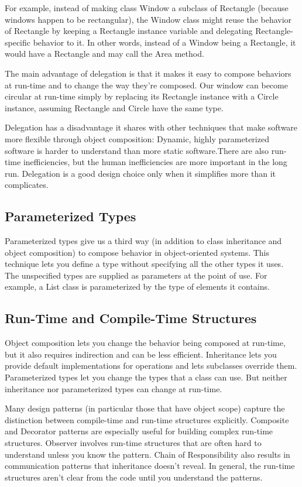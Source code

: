 \documentclass{article}
\begin{document}
For example, instead of making class Window a subclass of Rectangle (because windows happen to be rectangular), the Window class might reuse the behavior of Rectangle by keeping a Rectangle instance variable and delegating Rectangle-specific behavior to it. In other words, instead of a Window being a Rectangle, it would have a Rectangle and may call the Area method.

The main advantage of delegation is that it makes it easy to compose behaviors at run-time and to change the way they're composed. Our window can become circular at run-time simply by replacing its Rectangle instance with a Circle instance, assuming Rectangle and Circle have the same type.

Delegation has a disadvantage it shares with other techniques that make software more flexible through object composition: Dynamic, highly parameterized software is harder to understand than more static software.There are also run-time inefficiencies, but the human inefficiencies are more important in the long run. Delegation is a good design choice only when it simplifies more than it complicates.

\subsection{Parameterized Types}
Parameterized types give us a third way (in addition to class inheritance and object composition) to compose behavior in object-oriented systems. This
technique lets you define a type without specifying all the other types it uses. The unspecified types are supplied as parameters at the point of use. For example, a List class is parameterized by the type of elements it contains.


\subsection{Run-Time and Compile-Time Structures}

Object composition lets you change the behavior being composed at run-time, but it also requires indirection and can be less efficient. Inheritance lets you provide default implementations for operations and lets subclasses override them. Parameterized types let you change the types that a class can use. But neither inheritance nor parameterized types can change at run-time.

Many design patterns (in particular those that have object scope) capture the distinction between compile-time and run-time structures explicitly. Composite and Decorator patterns are especially useful for building complex run-time structures. Observer involves run-time structures that are often hard to understand unless you know the pattern. Chain of Responsibility also results in communication patterns that inheritance doesn't reveal. In general, the run-time structures aren't clear from the code until you understand the patterns.
\end{document}
